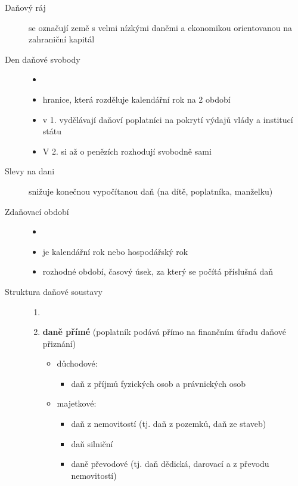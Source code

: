 \begin{description}
    \item[Daňový ráj] se označují země s velmi nízkými daněmi a ekonomikou orientovanou na zahraniční kapitál
    \item[Den daňové svobody]
        \begin{itemize}
            \item []
            \item hranice, která rozděluje kalendářní rok na 2 období
            \item v 1. vydělávají daňoví poplatníci na pokrytí výdajů vlády a institucí státu
            \item V 2. si až o penězích rozhodují svobodně sami
        \end{itemize}
    \item[Slevy na dani] snižuje konečnou vypočítanou daň (na dítě, poplatníka, manželku)
    \item[Zdaňovací období]
        \begin{itemize}
            \item []
            \item je kalendářní rok nebo hospodářský rok
            \item rozhodné období, časový úsek, za který se počítá příslušná daň
        \end{itemize}
    \item[Struktura daňové soustavy]
        \begin{enumerate}
            \item []
            \item \textbf{daně přímé} (poplatník podává přímo na finančním úřadu daňové přiznání)
                \begin{itemize}
                    \item důchodové:
                        \begin{itemize}
                            \item daň z příjmů fyzických osob a právnických osob
                        \end{itemize}
                    \item majetkové:
                        \begin{itemize}
                            \item daň z nemovitostí (tj. daň z pozemků, daň ze staveb)
                            \item daň silniční
                            \item daně převodové (tj. daň dědická, darovací a z převodu nemovitostí)

\end{itemize}
\end{itemize}
\end{enumerate}
\end{description}
